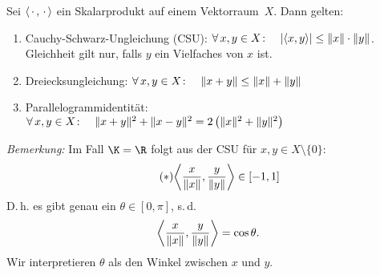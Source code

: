 \begin{thSatz}\label{vl02:satz2.8}
    Sei $\left\langle\,\cdot\,,\,\cdot\,\right\rangle$ ein Skalarprodukt auf einem Vektorraum~$X$. Dann gelten:
    \begin{enumerate}[(1)]
        \item 
            Cauchy-Schwarz-Ungleichung (CSU): \quad
            $\forall\,x,y\in X\colon\quad
            \lvert\left\langle x,y\right\rangle\rvert \leq \lVert x\rVert\cdot\lVert y\rVert$.\\
            Gleichheit gilt nur, falls $y$ ein Vielfaches von $x$ ist.
        \item
            Dreiecksungleichung: \quad
            $\forall\,x,y\in X\colon\quad \lVert x+y\rVert\leq\lVert x\rVert+\lVert y\rVert$
        \item
            Parallelogrammidentität:\quad
            $\forall\,x,y\in X\colon\quad
                \lVert x+y\rVert^2 + \lVert x-y\rVert^2 = 2\left( \lVert x\rVert^2+\lVert y\rVert^2
                \right)$
    \end{enumerate}
\end{thSatz}

\emph{Bemerkung:} Im Fall $\K=\R$ folgt aus der CSU für $x,y\in X\setminus\{0\}$:
\[ \label{2.8star} \tag{$\ast$}
    \SP{ \frac{x}{\norm x}, \frac{y}{\norm y} } \in [-1,1]
\] 
D.\,h. es gibt genau ein $\theta\in[0,\pi]$, s.\,d. 
\[ \left\langle \frac{x}{\lVert x\rVert}, \frac{y}{\lVert y\rVert} \right\rangle = \cos\theta 
. \]
Wir interpretieren $\theta$ als den Winkel zwischen $x$ und $y$.

